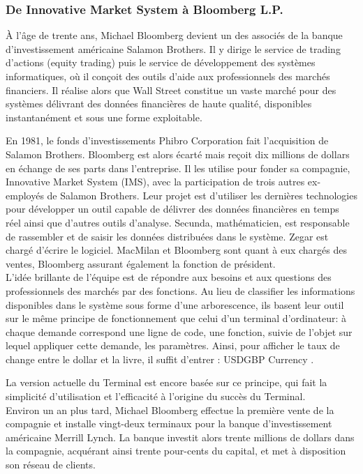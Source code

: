 \documentclass[11pt, oneside, titlepage, a4paper]{article}
\begin{document}
		\subsubsection{De Innovative Market System à Bloomberg L.P.}
À l'âge de trente ans, Michael Bloomberg devient un des associés de la banque d'investissement américaine Salamon Brothers. Il y dirige le service de trading d'actions (equity trading) puis le service de développement des systèmes informatiques, où il conçoit des outils d'aide aux professionnels des marchés financiers. Il réalise alors que Wall Street constitue un vaste marché pour des systèmes délivrant des données financières de haute qualité, disponibles instantanément et sous une forme exploitable.

En 1981, le fonds d'investissements Phibro Corporation fait l'acquisition de Salamon Brothers. Bloomberg est alors écarté mais reçoit dix millions de dollars en échange de ses parts dans l'entreprise. Il les utilise pour fonder sa compagnie, Innovative Market System (IMS), avec la participation de trois autres ex-employés de Salamon Brothers. Leur projet est d'utiliser les dernières technologies pour développer un outil capable de délivrer des données financières en temps réel ainsi que d'autres outils d'analyse. Secunda, mathématicien, est responsable de rassembler et de saisir les données distribuées dans le système. Zegar est chargé d'écrire le logiciel. MacMilan et Bloomberg sont quant à eux chargés des ventes, Bloomberg assurant également la fonction de président.
\\

L'idée brillante de l'équipe est de répondre aux besoins et aux questions des professionnels des marchés par des fonctions. Au lieu de classifier les informations disponibles dans le système sous forme d'une arborescence, ils basent leur outil sur le même principe de fonctionnement que celui d'un terminal d'ordinateur: à chaque demande correspond une ligne de code, une fonction, suivie de l'objet sur lequel appliquer cette demande, les paramètres. Ainsi, pour afficher le taux de change entre le dollar et la livre, il suffit d'entrer : \og USDGBP Currency \fg{}.

La version actuelle du Terminal est encore basée sur ce principe, qui fait la simplicité d'utilisation et l'efficacité à l'origine du succès du Terminal.
\\

Environ un an plus tard, Michael Bloomberg effectue la première vente de la compagnie et installe vingt-deux terminaux pour la banque d'investissement américaine Merrill Lynch. La banque investit alors trente millions de dollars dans la compagnie, acquérant ainsi trente pour-cents du capital, et met à disposition son réseau de clients.
\end{document}
